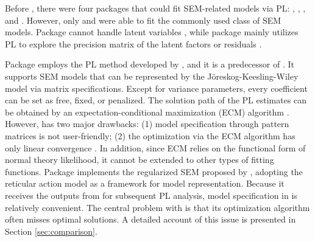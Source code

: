 \documentclass[nojss]{jss}
\begin{document}
Before , there were four packages that could fit SEM-related models via PL:  \citep{sparseSEM},  \citep{Huang2017a},  \citep{Jacobucci2017}, and  \citep{lvnet}. However, only  and  were able to fit the commonly used class of SEM models. Package  cannot handle latent variables \citep{Cai2013}, while package  mainly utilizes PL to explore the precision matrix of the latent factors or residuals \citep{Epskamp2017}.

Package  employs the PL method developed by \cite{Huang}, and it is a predecessor of . It supports SEM models that can be represented by the J{\"{o}}reskog-Keesling-Wiley model \citep{Keesling1972, Joreskog1973, Wiley1973} via matrix specifications. Except for variance parameters, every coefficient can be set as free, fixed, or penalized. The solution path of the PL estimates can be obtained by an expectation-conditional maximization (ECM) algorithm \citep{Meng1993}. However,  has two major drawbacks: (1) model specification through pattern matrices is not user-friendly; (2) the optimization via the ECM algorithm has only linear convergence \citep{Meng1994}. In addition, since ECM relies on the functional form of normal theory likelihood, it cannot be extended to other types of fitting functions. Package  implements the regularized SEM proposed by \cite{Jacobucci2016}, adopting the reticular action model \citep[RAM;][]{McArdle1984a} as a framework for model representation. Because it receives the outputs from  for subsequent PL analysis, model specification in  is relatively convenient. The central problem with  is that its optimization algorithm often misses optimal solutions. A detailed account of this issue is presented in Section \ref{sec:comparison}.
\end{document}
